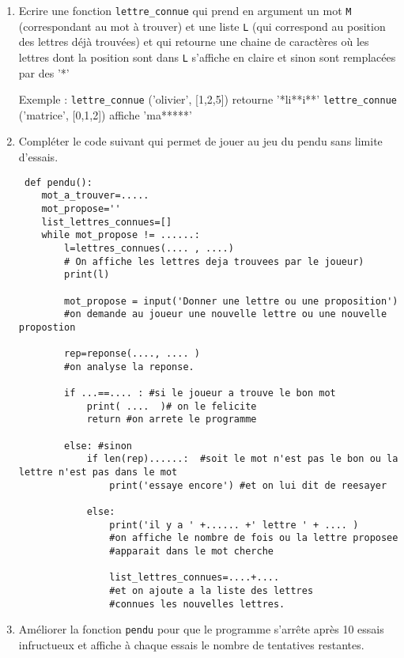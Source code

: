 \begin{exercice}
\begin{enumerate}
\item Ecrire une fonction \texttt{lettre\_connue} qui prend en argument un mot \texttt{M}  (correspondant au mot à trouver) et une liste \texttt{L}  (qui correspond au position des lettres déjà trouvées) et qui retourne une chaine de caractères où les lettres dont la position sont dans \texttt{L} s'affiche en claire et sinon sont remplacées par des '*'

Exemple : \texttt{lettre\_connue} ('olivier', [1,2,5]) retourne '*li**i**' 
\texttt{lettre\_connue} ('matrice', [0,1,2]) affiche 'ma*****'
 

 \item Compléter le code suivant qui permet de jouer au jeu du pendu  sans limite d'essais. 
\newpage
 \begin{lstlisting}
 def pendu():
    mot_a_trouver=.....
    mot_propose=''
    list_lettres_connues=[]
    while mot_propose != ......:    
        l=lettres_connues(.... , ....)
        # On affiche les lettres deja trouvees par le joueur)
        print(l)

        mot_propose = input('Donner une lettre ou une proposition') 
        #on demande au joueur une nouvelle lettre ou une nouvelle propostion

        rep=reponse(...., .... ) 
        #on analyse la reponse.

        if ...==.... : #si le joueur a trouve le bon mot
            print( ....  )# on le felicite
            return #on arrete le programme

        else: #sinon
            if len(rep)......:  #soit le mot n'est pas le bon ou la lettre n'est pas dans le mot
                print('essaye encore') #et on lui dit de reesayer

            else:
                print('il y a ' +...... +' lettre ' + .... )  
                #on affiche le nombre de fois ou la lettre proposee 
                #apparait dans le mot cherche
                
                list_lettres_connues=....+.... 
                #et on ajoute a la liste des lettres 
                #connues les nouvelles lettres.

 \end{lstlisting}
 
 \item Améliorer la fonction \texttt{pendu} pour que le programme s'arrête après 10 essais infructueux et affiche à chaque essais le nombre de tentatives restantes. 


\end{enumerate}
\end{exercice}
\begin{correction}

\end{correction}